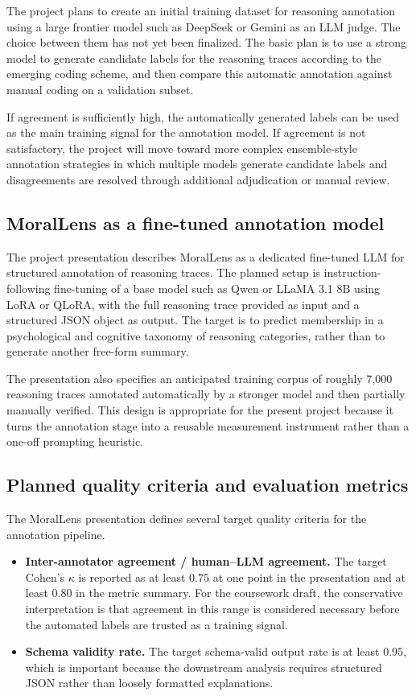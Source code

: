 \documentclass[14pt,a4paper]{extarticle}
\begin{document}
The project plans to create an initial training dataset for reasoning annotation using a large frontier model such as DeepSeek or Gemini as an LLM judge. The choice between them has not yet been finalized. The basic plan is to use a strong model to generate candidate labels for the reasoning traces according to the emerging coding scheme, and then compare this automatic annotation against manual coding on a validation subset.

If agreement is sufficiently high, the automatically generated labels can be used as the main training signal for the annotation model. If agreement is not satisfactory, the project will move toward more complex ensemble-style annotation strategies in which multiple models generate candidate labels and disagreements are resolved through additional adjudication or manual review.

\subsection{MoralLens as a fine-tuned annotation model}

The project presentation describes MoralLens as a dedicated fine-tuned LLM for structured annotation of reasoning traces. The planned setup is instruction-following fine-tuning of a base model such as Qwen or LLaMA 3.1 8B using LoRA or QLoRA, with the full reasoning trace provided as input and a structured JSON object as output. The target is to predict membership in a psychological and cognitive taxonomy of reasoning categories, rather than to generate another free-form summary.

The presentation also specifies an anticipated training corpus of roughly 7{,}000 reasoning traces annotated automatically by a stronger model and then partially manually verified. This design is appropriate for the present project because it turns the annotation stage into a reusable measurement instrument rather than a one-off prompting heuristic.

\subsection{Planned quality criteria and evaluation metrics}

The MoralLens presentation defines several target quality criteria for the annotation pipeline.

\begin{itemize}
    \item \textbf{Inter-annotator agreement / human--LLM agreement.} The target Cohen's $\kappa$ is reported as at least $0.75$ at one point in the presentation and at least $0.80$ in the metric summary. For the coursework draft, the conservative interpretation is that agreement in this range is considered necessary before the automated labels are trusted as a training signal.
    \item \textbf{Schema validity rate.} The target schema-valid output rate is at least $0.95$, which is important because the downstream analysis requires structured JSON rather than loosely formatted explanations.
\end{itemize}
\end{document}
